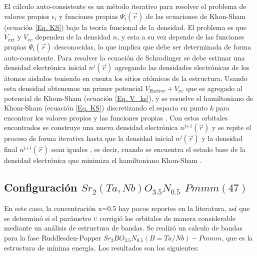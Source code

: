 El cálculo auto-consistente es un método iterativo para resolver el problema de valores propios $\epsilon_{i}$ y funciones propias $\Psi_{i}(\vec{r})$ de las ecuaciones de Khon-Sham (ecuación \ref{Eq. KS}) bajo la teoría funcional de la densidad. El problema es que $V_{\text{ext}}$ y $V_{xc}$ dependen de la densidad $n$, y esta a su vez depende de las funciones propias  $\Psi_{i}(\vec{r})$ desconocidas, lo que implica que debe ser determinada de forma auto-consistente.  Para resolver la ecuación de Schrodinger se debe estimar una densidad electrónica inicial $n^{j}(\vec{r})$ agregando las densidades electrónicas de los átomos aislados teniendo en cuenta los sitios atómicos de la estructura. Usando esta densidad obtenemos un primer potencial $V_{\text{Hartree}}+V_{xc}$ que es agregado al potencial de Khom-Sham (ecuación \ref{Eq. V_ks}), y se resuelve el hamiltoniano de Khom-Sham (ecuación \ref{Eq. KS}) discretizando el espacio en punto $k$ para encontrar los valores propios y las funciones propias \cite{lin_lu_ying_2019}. Con estos orbitales encontrados se construye una nueva densidad electrónica $n^{\text{j+1}}(\vec{r})$ y se repite el proceso de forma iterativa hasta que la densidad inicial $n^{j}(\vec{r})$ y la densidad final $n^{\text{j+1}}(\vec{r})$ sean iguales \cite{Woods2018Theory}, es decir, cuando se encuentra el estado base de la densidad electrónica que minimiza el hamiltoniano Khon-Sham \cite{GiustinoFeliciano2014Mmud}.


\subsection{Configuración $Sr_{2}(Ta,Nb)O_{3.5}N_{0.5}$  $Pmmm(47)$}

En este caso, la concentración x=0.5 hay pocos reportes en la literatura, así que se determinó si el parámetro \textsc{u} corrigió los orbitales de manera considerable mediante un análisis de estructura de bandas. Se realizó un calculo de bandas para la fase Ruddlesden-Popper $Sr_{2}BO_{3.5}N_{0.5}(B=Ta/Nb)-Pmmm$, que es la estructura de mínima energía. Los resultados son los siguientes:

